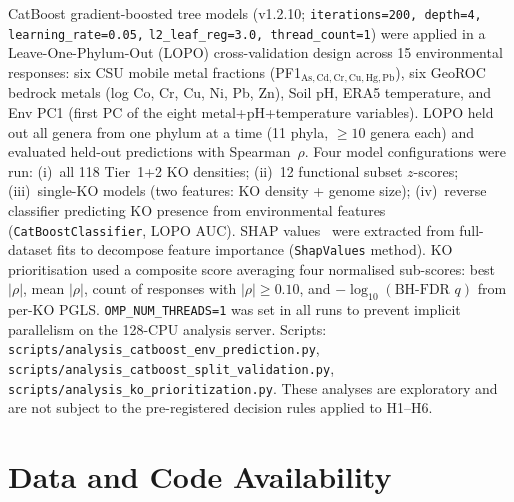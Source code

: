 \documentclass[times]{zHenriquesLab-StyleBioRxiv}
\begin{document}
CatBoost gradient-boosted tree models (v1.2.10;
\texttt{iterations=200, depth=4, learning\_rate=0.05,}
\texttt{l2\_leaf\_reg=3.0, thread\_count=1}) were applied in a
Leave-One-Phylum-Out (LOPO) cross-validation design across 15 environmental
responses: six CSU mobile metal fractions (PF1$_{\mathrm{As,Cd,Cr,Cu,Hg,Pb}}$),
six GeoROC bedrock metals (log Co, Cr, Cu, Ni, Pb, Zn), Soil pH, ERA5
temperature, and Env PC1 (first PC of the eight metal+pH+temperature variables).
LOPO held out all genera from one phylum at a time (11 phyla, $\geq\!10$ genera
each) and evaluated held-out predictions with Spearman~$\rho$.
Four model configurations were run: (i)~all 118 Tier~1+2 KO densities; (ii)~12
functional subset $z$-scores; (iii)~single-KO models (two features: KO density
+ genome size); (iv)~reverse classifier predicting KO presence from environmental
features (\texttt{CatBoostClassifier}, LOPO AUC).
SHAP values~\cite{lundberg2017} were extracted from full-dataset fits to decompose feature
importance (\texttt{ShapValues} method).
KO prioritisation used a composite score averaging four normalised sub-scores:
best $|\rho|$, mean $|\rho|$, count of responses with $|\rho|\geq 0.10$, and
$-\log_{10}(\text{BH-FDR }q)$ from per-KO PGLS.
\texttt{OMP\_NUM\_THREADS=1} was set in all runs to prevent implicit
parallelism on the 128-CPU analysis server.
Scripts: \texttt{scripts/analysis\_catboost\_env\_prediction.py},
\texttt{scripts/analysis\_catboost\_split\_validation.py},
\texttt{scripts/analysis\_ko\_prioritization.py}.
These analyses are exploratory and are not subject to the pre-registered
decision rules applied to H1--H6.



\section*{Data and Code Availability}
\end{document}
